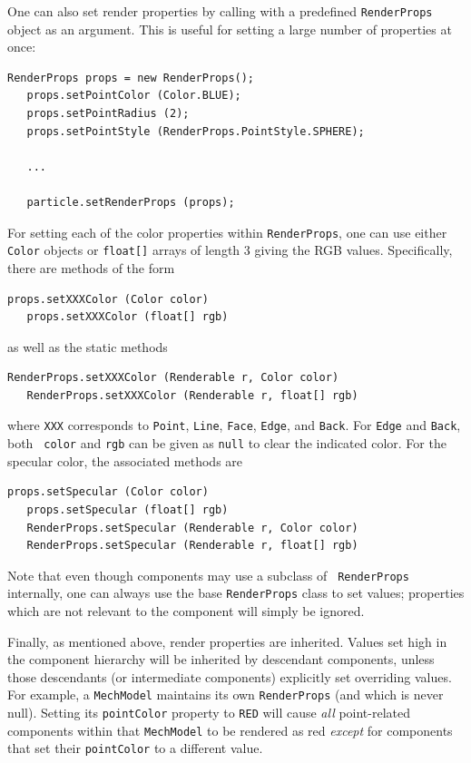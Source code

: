 One can also set render properties by calling
 with a
predefined {\tt RenderProps} object as an argument. This is useful for
setting a large number of properties at once:
%
\begin{lstlisting}[]
   RenderProps props = new RenderProps();
   props.setPointColor (Color.BLUE);
   props.setPointRadius (2);
   props.setPointStyle (RenderProps.PointStyle.SPHERE);

   ...

   particle.setRenderProps (props);
\end{lstlisting}

For setting each of the color properties within {\tt RenderProps},
one can use either {\tt Color} objects or {\tt float[]} arrays
of length 3 giving the RGB values. Specifically, there
are methods of the form
%
\begin{lstlisting}[]
   props.setXXXColor (Color color)
   props.setXXXColor (float[] rgb)
\end{lstlisting}
%
as well as the static methods
%
\begin{lstlisting}[]
   RenderProps.setXXXColor (Renderable r, Color color)
   RenderProps.setXXXColor (Renderable r, float[] rgb)
\end{lstlisting}
%
where {\tt XXX} corresponds to {\tt Point}, {\tt Line}, {\tt Face},
{\tt Edge}, and {\tt Back}. For {\tt Edge} and {\tt Back}, both {\tt
color} and {\tt rgb} can be given as {\tt null} to clear the indicated
color. For the specular color, the associated methods are
%
\begin{lstlisting}[]
   props.setSpecular (Color color)
   props.setSpecular (float[] rgb)
   RenderProps.setSpecular (Renderable r, Color color)
   RenderProps.setSpecular (Renderable r, float[] rgb)
\end{lstlisting}
%

\begin{sideblock}
Note that even though components may use a subclass of {\tt
RenderProps} internally, one can always use the base {\tt RenderProps}
class to set values; properties which are not relevant to the
component will simply be ignored.
\end{sideblock}

Finally, as mentioned above, render properties are inherited.  Values
set high in the component hierarchy will be inherited by descendant
components, unless those descendants (or intermediate components)
explicitly set overriding values.  For example, a {\tt MechModel}
maintains its own {\tt RenderProps} (and which is never null). Setting
its {\tt pointColor} property to {\tt RED} will cause {\it all}
point-related components within that {\tt MechModel} to be rendered as
red {\it except} for components that set their {\tt pointColor} to a
different value.

